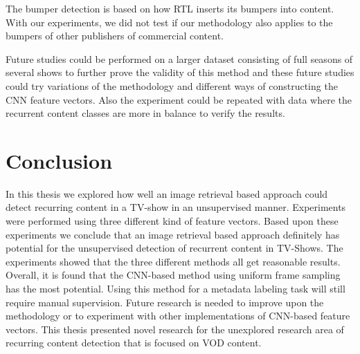 \documentclass{article}
\begin{document}
The bumper detection is based on how RTL inserts its bumpers into content. With our experiments, we did not test if our methodology also applies to the bumpers of other publishers of commercial content.

Future studies could be performed on a larger dataset consisting of full seasons of several shows to further prove the validity of this method and these future studies could try variations of the methodology and different ways of constructing the CNN feature vectors. Also the experiment could be repeated with data where the recurrent content classes are more in balance to verify the results.
\\

\section{Conclusion} \label{conclusion}
In this thesis we explored how well an image retrieval based approach could detect recurring content in a TV-show in an unsupervised manner. Experiments were performed using three different kind of feature vectors. Based upon these experiments we conclude that an image retrieval based approach definitely has potential for the unsupervised detection of recurrent content in TV-Shows. The experiments showed that the three different methods all get reasonable results. Overall, it is found that the CNN-based method using uniform frame sampling has the most potential. Using this method for a metadata labeling task will still require manual supervision. Future research is needed to improve upon the methodology or to experiment with other implementations of CNN-based feature vectors. This thesis presented novel research for the unexplored research area of recurring content detection that is focused on VOD content.



\end{document}
